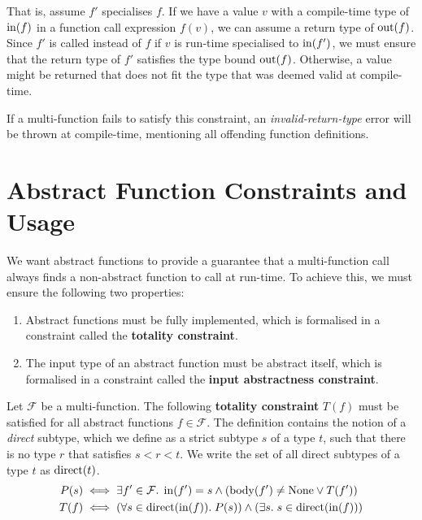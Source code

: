 \noindent That is, assume $f'$ specialises $f$. If we have a value $v$ with a compile-time type of $\operatorname{in}(f)$ in a function call expression $f(v)$, we can assume a return type of $\operatorname{out}(f)$. Since $f'$ is called instead of $f$ if $v$ is run-time specialised to $\operatorname{in}(f')$, we must ensure that the return type of $f'$ satisfies the type bound $\operatorname{out}(f)$. Otherwise, a value might be returned that does not fit the type that was deemed valid at compile-time.

If a multi-function fails to satisfy this constraint, an \textit{invalid-return-type} error will be thrown at compile-time, mentioning all offending function definitions.



\section{Abstract Function Constraints and Usage} \label{section:abstract-function-constraints}

We want abstract functions to provide a guarantee that a multi-function call always finds a non-abstract function to call at run-time. To achieve this, we must ensure the following two properties:
\begin{enumerate}
	\item Abstract functions must be fully implemented, which is formalised in a constraint called the \textbf{totality constraint}.
	\item The input type of an abstract function must be abstract itself, which is formalised in a constraint called the \textbf{input abstractness constraint}.
\end{enumerate}

\begin{definition} \label{def:totality-constraint}
	Let $\mathcal{F}$ be a multi-function. The following \textbf{totality constraint} $T(f)$ must be satisfied for all abstract functions $f \in \mathcal{F}$. The definition contains the notion of a \textit{direct} subtype, which we define as a strict subtype $s$ of a type $t$, such that there is no type $r$ that satisfies $s < r < t$. We write the set of all direct subtypes of a type $t$ as $\operatorname{direct}(t)$.
	\begin{align*}
		P(s) &\iff \exists f' \in \mathcal{F}.\; \operatorname{in}(f') = s \land (\operatorname{body}(f') \neq \text{None} \lor T(f')) \\
		T(f) &\iff (\forall s \in \operatorname{direct}(\operatorname{in}(f)).\; P(s)) \land (\exists s.\; s \in \operatorname{direct}(\operatorname{in}(f)))
	\end{align*}
\end{definition}

